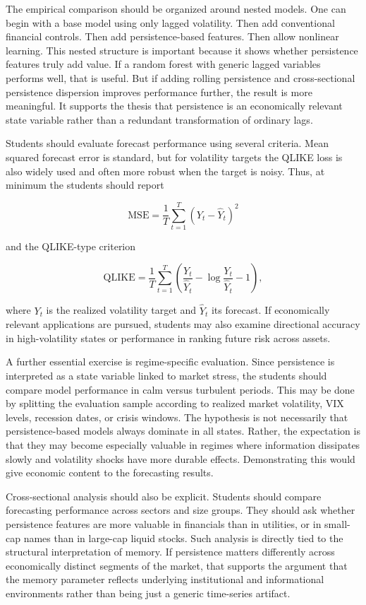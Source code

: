 \documentclass[12pt]{article}
\begin{document}
The empirical comparison should be organized around nested models. One can begin with a base model using only lagged volatility. Then add conventional financial controls. Then add persistence-based features. Then allow nonlinear learning. This nested structure is important because it shows whether persistence features truly add value. If a random forest with generic lagged variables performs well, that is useful. But if adding rolling persistence and cross-sectional persistence dispersion improves performance further, the result is more meaningful. It supports the thesis that persistence is an economically relevant state variable rather than a redundant transformation of ordinary lags.

Students should evaluate forecast performance using several criteria. Mean squared forecast error is standard, but for volatility targets the QLIKE loss is also widely used and often more robust when the target is noisy. Thus, at minimum the students should report

\[\mathrm{MSE} = \frac{1}{T}\sum_{t=1}^{T}(Y_t - \hat{Y}_t)^2\]

and the QLIKE-type criterion

\[\mathrm{QLIKE} = \frac{1}{T}\sum_{t=1}^{T}\left(\frac{Y_t}{\hat{Y}_t} - \log\frac{Y_t}{\hat{Y}_t} - 1\right),\]

where $Y_t$ is the realized volatility target and $\hat{Y}_t$ its forecast. If economically relevant applications are pursued, students may also examine directional accuracy in high-volatility states or performance in ranking future risk across assets.

A further essential exercise is regime-specific evaluation. Since persistence is interpreted as a state variable linked to market stress, the students should compare model performance in calm versus turbulent periods. This may be done by splitting the evaluation sample according to realized market volatility, VIX levels, recession dates, or crisis windows. The hypothesis is not necessarily that persistence-based models always dominate in all states. Rather, the expectation is that they may become especially valuable in regimes where information dissipates slowly and volatility shocks have more durable effects. Demonstrating this would give economic content to the forecasting results.

Cross-sectional analysis should also be explicit. Students should compare forecasting performance across sectors and size groups. They should ask whether persistence features are more valuable in financials than in utilities, or in small-cap names than in large-cap liquid stocks. Such analysis is directly tied to the structural interpretation of memory. If persistence matters differently across economically distinct segments of the market, that supports the argument that the memory parameter reflects underlying institutional and informational environments rather than being just a generic time-series artifact.
\end{document}
